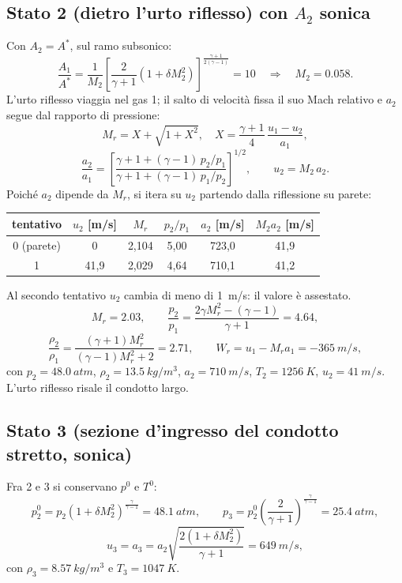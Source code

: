 \documentclass[11pt,a4paper]{article}
\newcommand{\Mr}{M_{r}}
\begin{document}
\subsection{Stato 2 (dietro l'urto riflesso) con $A_2$ sonica}
Con $A_2=A^*$, sul ramo subsonico:
\[
  \frac{A_1}{A^*}=\frac1{M_2}\left[\frac{2}{\gamma+1}\left(1+\delta M_2^2\right)\right]^{\frac{\gamma+1}{2(\gamma-1)}}=10
  \quad\Rightarrow\quad M_2=\num{0.058}.
\]
L'urto riflesso viaggia nel gas 1; il salto di velocità fissa il suo Mach relativo e $a_2$ segue dal
rapporto di pressione:
\[
  \Mr=X+\sqrt{1+X^2},\quad X=\frac{\gamma+1}{4}\,\frac{u_1-u_2}{a_1},
\]
\[
  \frac{a_2}{a_1}=\left[\frac{\gamma+1+(\gamma-1)\,p_2/p_1}{\gamma+1+(\gamma-1)\,p_1/p_2}\right]^{1/2},\qquad
  u_2=M_2\,a_2 .
\]
Poiché $a_2$ dipende da $\Mr$, si itera su $u_2$ partendo dalla riflessione su parete:
\begin{table}[H]
  \centering
  \begin{tabular}{cccccc}
    \toprule
    tentativo & $u_2$ [m/s] & $\Mr$ & $p_2/p_1$ & $a_2$ [m/s] & $M_2a_2$ [m/s] \\
    \midrule
    0 (parete) & 0 & 2,104 & 5,00 & 723,0 & 41,9 \\
    1 & 41,9 & 2,029 & 4,64 & 710,1 & 41,2 \\
    \bottomrule
  \end{tabular}
\end{table}
Al secondo tentativo $u_2$ cambia di meno di \SI{1}{m/s}: il valore è assestato.
\[
  \Mr=\num{2.03},\qquad \frac{p_2}{p_1}=\frac{2\gamma\Mr^2-(\gamma-1)}{\gamma+1}=\num{4.64},
\]
\[
  \frac{\rho_2}{\rho_1}=\frac{(\gamma+1)\Mr^2}{(\gamma-1)\Mr^2+2}=\num{2.71},\qquad
  W_r=u_1-\Mr a_1=\SI{-365}{m/s},
\]
con $p_2=\SI{48.0}{atm}$, $\rho_2=\SI{13.5}{kg/m^3}$, $a_2=\SI{710}{m/s}$, $T_2=\SI{1256}{K}$,
$u_2=\SI{41}{m/s}$. L'urto riflesso risale il condotto largo.

\subsection{Stato 3 (sezione d'ingresso del condotto stretto, sonica)}
Fra 2 e 3 si conservano $p^0$ e $T^0$:
\[
  p^0_2=p_2\left(1+\delta M_2^2\right)^{\frac{\gamma}{\gamma-1}}=\SI{48.1}{atm},\qquad
  p_3=p^0_2\left(\frac{2}{\gamma+1}\right)^{\frac{\gamma}{\gamma-1}}=\SI{25.4}{atm},
\]
\[
  u_3=a_3=a_2\sqrt{\frac{2\left(1+\delta M_2^2\right)}{\gamma+1}}=\SI{649}{m/s},
\]
con $\rho_3=\SI{8.57}{kg/m^3}$ e $T_3=\SI{1047}{K}$.
\end{document}
